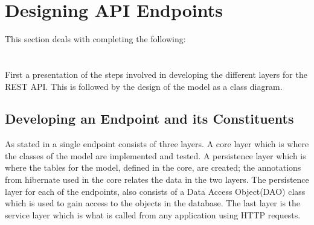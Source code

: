 \section{Designing API Endpoints}\label{sec:generalEP}
This section deals with completing the following: \\
 \\
 \\
\noindent
First a presentation of the steps involved in developing the different layers for the REST API.
This is followed by the design of the model as a class diagram.

\subsection{Developing an Endpoint and its Constituents}
As stated in  a single endpoint consists of three layers.
A core layer which is where the classes of the model are implemented and tested.
A persistence layer which is where the tables for the model, defined in the core, are created; the annotations from hibernate used in the core relates the data in the two layers.
The persistence layer for each of the endpoints, also consists of a Data Access Object(DAO) class which is used to gain access to the objects in the database.
The last layer is the service layer which is what is called from any application using HTTP requests.

